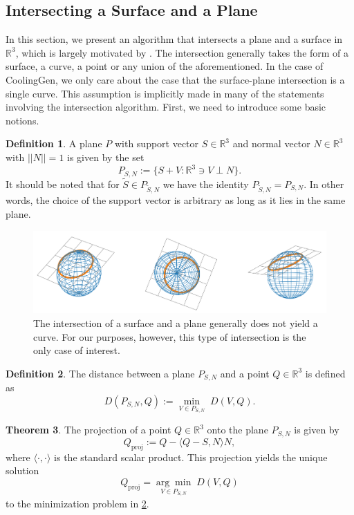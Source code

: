 \documentclass[a4paper, 11pt]{report}
\theoremstyle{definition}
\newtheorem{definition}{Definition}[section]
\newtheorem{theorem}[definition]{Theorem}
\begin{document}
\subsection{Intersecting a Surface and a Plane}\label{sec:surfaceplaneintersection}
	In this section, we present an algorithm that intersects a plane and a surface in $\mathbb{R}^3$, which is largely motivated by \cite{Barnhill1990}. The intersection generally takes the form of a surface, a curve, a point or any union of the aforementioned. In the case of CoolingGen, we only care about the case that the surface-plane intersection is a single curve. This assumption is implicitly made in many of the statements involving the intersection algorithm. First, we need to introduce some basic notions.

	\begin{definition}
		A plane $P$ with support vector $S \in \mathbb{R}^3$ and normal vector $N \in \mathbb{R}^3$ with $||N|| = 1$ is given by the set
			$$ P_{S,N} := \{S+V : \mathbb{R}^3 \ni V \perp N\}. $$
		It should be noted that for $\tilde S \in P_{\tilde S, N}$ we have the identity $P_{\tilde S, N} = P_{S, N}$. In other words, the choice of the support vector is arbitrary as long as it lies in the same plane.
	\end{definition}

	\begin{figure}[H]
		\centering
		\includegraphics[width=\textwidth]{../python/surfacePlaneIntersection1_cropped.png}
		\caption{The intersection of a surface and a plane generally does not yield a curve. For our purposes, however, this type of intersection is the only case of interest.}
		\label{fig:planeintersectionexample}
	\end{figure}

	\begin{definition}\label{def:distanceplane}
		The distance between a plane $P_{S,N}$ and a point $Q \in \mathbb{R}^3$ is defined as
			$$ D(P_{S,N}, Q) := \underset{V \in P_{S,N}}{\min} \; D(V, Q). $$
	\end{definition}

	\begin{theorem}\label{thm:planeprojection}
		The projection of a point $Q \in \mathbb{R}^3$ onto the plane $P_{S,N}$ is given by
			$$Q_\textrm{proj} := Q - \langle Q - S, N \rangle N,$$
		where $\langle \cdot,\cdot \rangle$ is the standard scalar product. This projection yields the unique solution
			$$ Q_\textrm{proj} = \underset{V \in P_{S,N}}{\arg\min} \; D(V, Q) $$
		to the minimization problem in \ref{def:distanceplane}.
	\end{theorem}
\end{document}
